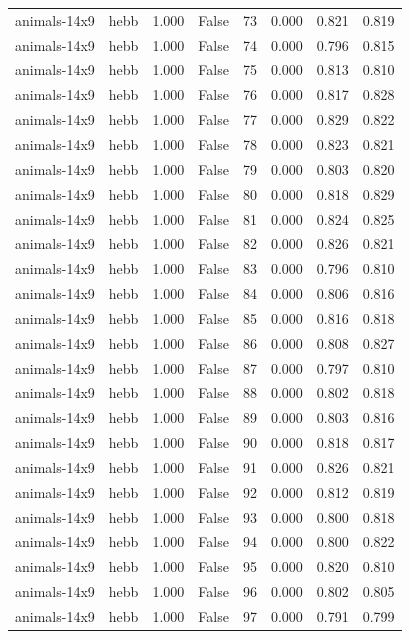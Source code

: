 \begin{tabular}{llrrrrrr}
animals-14x9 & hebb & 1.000 & False & 73 & 0.000 & 0.821 & 0.819 \\
animals-14x9 & hebb & 1.000 & False & 74 & 0.000 & 0.796 & 0.815 \\
animals-14x9 & hebb & 1.000 & False & 75 & 0.000 & 0.813 & 0.810 \\
animals-14x9 & hebb & 1.000 & False & 76 & 0.000 & 0.817 & 0.828 \\
animals-14x9 & hebb & 1.000 & False & 77 & 0.000 & 0.829 & 0.822 \\
animals-14x9 & hebb & 1.000 & False & 78 & 0.000 & 0.823 & 0.821 \\
animals-14x9 & hebb & 1.000 & False & 79 & 0.000 & 0.803 & 0.820 \\
animals-14x9 & hebb & 1.000 & False & 80 & 0.000 & 0.818 & 0.829 \\
animals-14x9 & hebb & 1.000 & False & 81 & 0.000 & 0.824 & 0.825 \\
animals-14x9 & hebb & 1.000 & False & 82 & 0.000 & 0.826 & 0.821 \\
animals-14x9 & hebb & 1.000 & False & 83 & 0.000 & 0.796 & 0.810 \\
animals-14x9 & hebb & 1.000 & False & 84 & 0.000 & 0.806 & 0.816 \\
animals-14x9 & hebb & 1.000 & False & 85 & 0.000 & 0.816 & 0.818 \\
animals-14x9 & hebb & 1.000 & False & 86 & 0.000 & 0.808 & 0.827 \\
animals-14x9 & hebb & 1.000 & False & 87 & 0.000 & 0.797 & 0.810 \\
animals-14x9 & hebb & 1.000 & False & 88 & 0.000 & 0.802 & 0.818 \\
animals-14x9 & hebb & 1.000 & False & 89 & 0.000 & 0.803 & 0.816 \\
animals-14x9 & hebb & 1.000 & False & 90 & 0.000 & 0.818 & 0.817 \\
animals-14x9 & hebb & 1.000 & False & 91 & 0.000 & 0.826 & 0.821 \\
animals-14x9 & hebb & 1.000 & False & 92 & 0.000 & 0.812 & 0.819 \\
animals-14x9 & hebb & 1.000 & False & 93 & 0.000 & 0.800 & 0.818 \\
animals-14x9 & hebb & 1.000 & False & 94 & 0.000 & 0.800 & 0.822 \\
animals-14x9 & hebb & 1.000 & False & 95 & 0.000 & 0.820 & 0.810 \\
animals-14x9 & hebb & 1.000 & False & 96 & 0.000 & 0.802 & 0.805 \\
animals-14x9 & hebb & 1.000 & False & 97 & 0.000 & 0.791 & 0.799 \\

\end{tabular}
